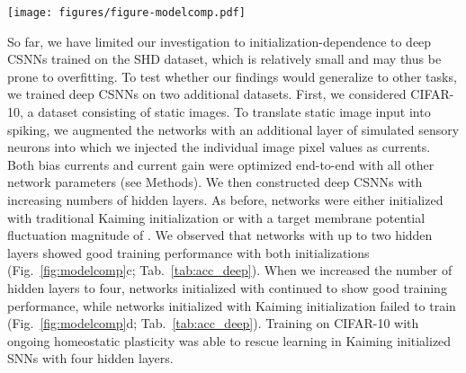 \documentclass[11pt,a4paper]{article}
\begin{document}
\begin{SCfigure}[10][t]
    \centering
    \texttt{[image: figures/figure-modelcomp.pdf]}
    \caption{\textbf{Fluctuation-driven initialization enables training of deep \acp{SNN} across multiple datasets.} 
    \textbf{(a)}~Test accuracy of three-layer \acp{CSNN} trained on the SHD dataset. Networks were initialized either with standard Kaiming initialization (Kaiming) or fluctuation-driven initialization with . All error bars indicate standard deviation across five runs.
    \textbf{(b)}~Test accuracy of seven-layer \acp{CSNN} trained on the SHD dataset. Networks with Kaiming initialization were additionally trained with ongoing homeostatic plasticity (Kaiming \& Hom.\ plast.) 
    \textbf{(c)}~Same as panel (a), but for two-layer networks trained on the CIFAR-10 dataset.
    \textbf{(d)}~Same as panel (b), but for four-layer networks trained on the CIFAR-10 dataset.
    \textbf{(e)}~Same as panel (a), but for six-layer networks  trained on the DVS-Gestures dataset.
    \textbf{(f)}~Same as panel (b), but for eight-layer networks trained on the DVS-Gestures dataset.
    }
    \label{fig:modelcomp}
\end{SCfigure}


So far, we have limited our investigation to initialization-dependence to deep \acp{CSNN} trained on the SHD dataset, which is relatively small and may thus be prone to overfitting.
To test whether our findings would generalize to other tasks, we trained deep \acp{CSNN} on two additional datasets. 
First, we considered CIFAR-10, a dataset consisting of static images.
To translate static image input into spiking, we augmented the networks with an additional layer of simulated sensory neurons into which we injected the individual image pixel values as currents. 
Both bias currents and current gain were optimized end-to-end with all other network parameters (see Methods).
We then constructed deep \acp{CSNN} with increasing numbers of hidden layers.
As before, networks were either initialized with traditional Kaiming initialization or with a target membrane potential fluctuation magnitude of .
We observed that networks with up to two hidden layers showed good training performance with both initializations (Fig.~\ref{fig:modelcomp}c; Tab.~\ref{tab:acc_deep}). 
When we increased the number of hidden layers to four, networks initialized with  continued to show good training performance, while networks initialized with Kaiming initialization failed to train (Fig.~\ref{fig:modelcomp}d; Tab.~\ref{tab:acc_deep}).
Training on CIFAR-10 with ongoing homeostatic plasticity was able to rescue learning in Kaiming initialized \acp{SNN} with four hidden layers.
\end{document}

